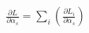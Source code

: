\documentclass[10pt]{article}
\begin{document}
\begin{align*}\frac{\partial L}{\partial \alpha_s} = \sum_i \left( \frac{\partial L_i}{\partial \alpha_s} \right)\end{align*}
\end{document}
